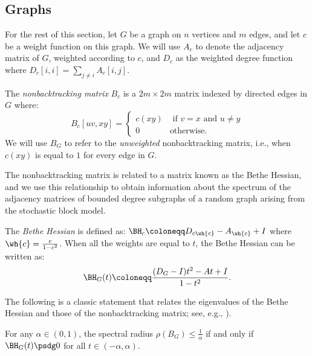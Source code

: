\documentclass[11pt,letterpaper]{article}
\begin{document}
\subsection{Graphs} \label{sec:graph-prelims}

    For the rest of this section, let $G$ be a graph on $n$ vertices and $m$ edges, and let $c$ be a weight function on this graph.
    We will use $A_c$ to denote the adjacency matrix of $G$, weighted according to $c$, and $D_c$ as the weighted degree function where $D_c[i,i] = \sum_{j\ne i} A_c[i,j]$.
    \begin{definition}
        The \emph{nonbacktracking matrix} $B_c$ is a $2m\times 2m$ matrix indexed by directed edges in $G$ where:
        \[
            B_{c}[uv, xy] =
            \begin{cases}
                c(xy) &\text{ if }v=x\text{ and }u\ne y \\
                0 &\text{otherwise.}
            \end{cases}
        \]
        We will use $B_G$ to refer to the \emph{unweighted} nonbacktracking matrix, i.e., when $c(xy)$ is equal to $1$ for every edge in $G$.
    \end{definition}

    The nonbacktracking matrix is related to a matrix known as the Bethe Hessian, and we use this relationship to obtain information about the spectrum of the adjacency matrices of bounded degree subgraphs of a random graph arising from the stochastic block model.
    \begin{definition}
        \label{def:bethe-hessian}
        The \emph{Bethe Hessian} is defined as:
        \(
            \BH_{c} \coloneqq D_{c\wh{c}} - A_{\wh{c}} + I
        \)
        where $\wh{c} = \frac{c}{1-c^2}$.
        When all the weights are equal to $t$, the Bethe Hessian can be written as:
        \[
            \BH_G(t) \coloneqq \frac{(D_G-I)t^2 - At + I}{1-t^2}.
        \]
    \end{definition}

    The following is a classic statement that relates the eigenvalues of the Bethe Hessian and those of the nonbacktracking matrix; see, e.g., \cite[Proof of Theorem 5.1]{FM17}).
    \begin{lemma}
        For any $\alpha\in(0,1)$, the spectral radius $\rho(B_G) \le \frac{1}{\alpha}$ if and only if $\BH_G(t)\psdg 0$ for all $t\in(-\alpha,\alpha)$.
    \end{lemma}
\end{document}
